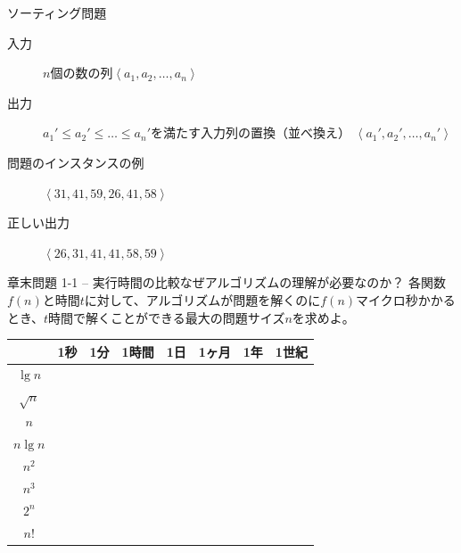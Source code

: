 \documentclass[unicode,11pt,aspectratio=169,notes]{beamer} %
\begin{document}

\begin{frame}{ソーティング問題}
  \begin{description}
  \item[入力] $n$個の数の列$\left\langle a_1, a_2, \ldots, a_n\right\rangle$

  \item[出力] $a_1'\leq a_2'\leq \ldots\leq a_n'$を満たす入力列の置換（並べ換え）
  $\left\langle a_1', a_2', \ldots, a_n'\right\rangle$
  \end{description}
  
  \vspace{5mm}

  \begin{description}
  \item[問題のインスタンスの例]
  $\left\langle 31, 41, 59, 26, 41, 58\right\rangle$

  \item[正しい出力] $\left\langle 26, 31, 41, 41, 58, 59\right\rangle$
  \end{description}
\end{frame}


\begin{frame}{章末問題 1-1 -- 実行時間の比較}{なぜアルゴリズムの理解が必要なのか？}
  各関数$f(n)$と時間$t$に対して、アルゴリズムが問題を解くのに$f(n)$マイクロ秒かかる
  とき、$t$時間で解くことができる最大の問題サイズ$n$を求めよ。

  \begin{center}
    \begin{tabular}{|c|c|c|c|c|c|c|c|}
      \hline
      & 1秒 & 1分 & 1時間 & 1日 & 1ヶ月 & 1年 & 1世紀 \\ \hline
      $\lg n$ & & & & & & & \\ \hline
      $\sqrt{n}$ & & & & & & & \\ \hline
      $n$ & & & & & & & \\ \hline
      $n\lg n$ & & & & & & & \\ \hline
      $n^2$ & & & & & & & \\ \hline
      $n^3$ & & & & & & & \\ \hline
      $2^n$ & & & & & & & \\ \hline
      $n!$ & & & & & & & \\
      \hline
    \end{tabular}
  \end{center}
\end{frame}
\end{document}
